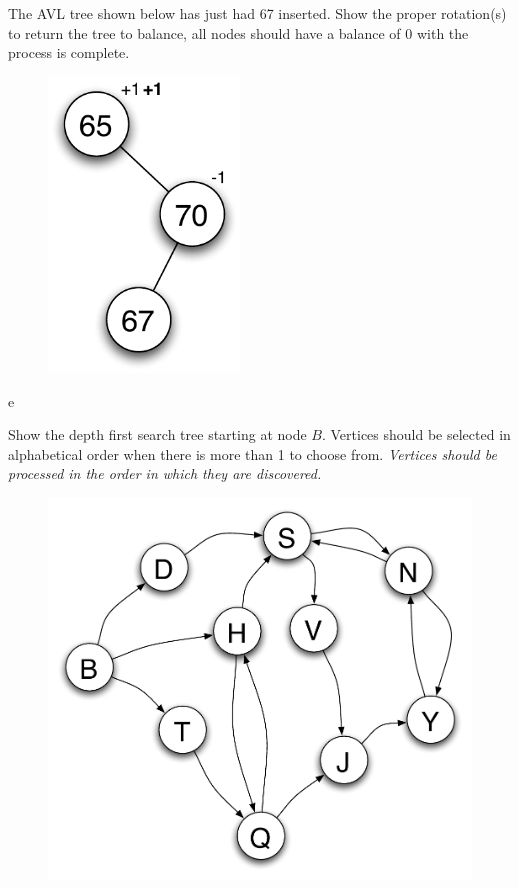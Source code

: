 \documentclass[11pt]{exam}
\begin{document}
\begin{questions}
\question[5] The AVL tree shown below has just had 67 inserted.  Show the proper rotation(s) to return the tree to balance, all nodes should have a balance of 0 with the process is complete.
\begin{figure}[htbp]
	   \includegraphics[width=2in]{final_rotate_question} 
\end{figure}
\newpage

e

\newpage
\question[12] Show the depth first search tree starting at node $B$.  Vertices should be selected in alphabetical order when there is more than 1 to choose from.   {\it Vertices should be processed in the order in which they are discovered.}
\begin{figure}[htbp]
	\begin{center}
	   \includegraphics[width=5.5in]{final_graph_question}
	\end{center}   
	\label{fig:graph}
\end{figure}


\end{questions}
\end{document}
